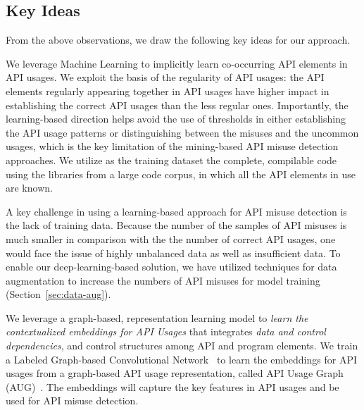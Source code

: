 \subsection{Key Ideas}
\label{sec:key-ideas}

From the above observations, we draw the following key ideas for our
approach.

\begin{key-idea}
We leverage Machine Learning to implicitly learn co-occurring API
elements in API usages. We exploit the basis of the regularity of API
usages: the API elements regularly appearing together in API usages
have higher impact in establishing the correct API usages than the
less regular ones. Importantly, the learning-based direction helps
avoid the use of thresholds in either establishing the API usage
patterns or distinguishing between the misuses and the uncommon
usages, which is the key limitation of the mining-based API misuse
detection approaches. We utilize as the training dataset the
complete, compilable code using the libraries from a large code
corpus, in which all the API elements in use are known.
\end{key-idea}


\begin{key-idea}
A key challenge in using a learning-based approach for API misuse
detection is the lack of training data. Because the number of the
samples of API misuses is much smaller in comparison with the the
number of correct API usages, one would face the issue of highly
unbalanced data as well as insufficient data. To enable our
deep-learning-based solution, we have utilized techniques for
data augmentation to increase the numbers of API misuses for model
training (Section~\ref{sec:data-aug}).
\end{key-idea}


\begin{key-idea} We leverage a graph-based, representation
  learning model to {\em learn the contextualized embeddings for API
    Usages} that integrates {\em data and control dependencies}, and
  control structures among API and program elements. We train a
  Labeled Graph-based Convolutional Network~\cite{label-gcn} to learn
  the embeddings for API usages from a graph-based API usage
  representation, called API Usage Graph (AUG)~\cite{msr19}. The
  embeddings will capture the key features in API usages and be used
  for API misuse detection.
\end{key-idea}
